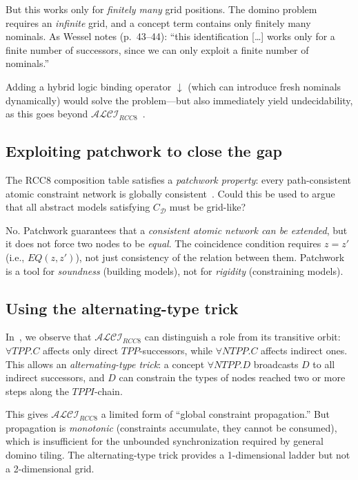\documentclass[11pt]{article}
\newcommand{\ALCIRCC}[1]{\ensuremath{\mathcal{ALCI}_{\mathit{RCC#1}}}}
\begin{document}
But this works only for \emph{finitely many} grid positions.  The domino
problem requires an \emph{infinite} grid, and a concept term contains only
finitely many nominals.  As Wessel notes (p.~43--44): ``this identification
[\ldots] works only for a finite number of successors, since we can only
exploit a finite number of nominals.''

Adding a hybrid logic binding operator $\downarrow$ (which can
introduce fresh nominals dynamically) would solve the problem---but also
immediately yield undecidability, as this goes beyond
$\ALCIRCC{8}$~\cite{Wessel2003}.

\subsection{Exploiting patchwork to close the gap}

The RCC8 composition table satisfies a \emph{patchwork property}: every
path-consistent atomic constraint network is globally
consistent~\cite{RenzNebel1999}.  Could this be used to argue that all
abstract models satisfying $C_\mathcal{D}$ must be grid-like?

No.  Patchwork guarantees that a \emph{consistent atomic network can be
extended}, but it does not force two nodes to be \emph{equal}.  The
coincidence condition requires $z = z'$ (i.e., $EQ(z,z')$), not just
consistency of the relation between them.  Patchwork is a tool for
\emph{soundness} (building models), not for \emph{rigidity} (constraining
models).

\subsection{Using the alternating-type trick}

In~\cite{OurMainPaper}, we observe that $\ALCIRCC{8}$ can distinguish a
role from its transitive orbit: $\forall TPP.C$ affects only direct
$TPP$-successors, while $\forall NTPP.C$ affects indirect ones.  This
allows an \emph{alternating-type trick}: a concept $\forall NTPP.D$ broadcasts
$D$ to all indirect successors, and $D$ can constrain the types of nodes
reached two or more steps along the $TPPI$-chain.

This gives $\ALCIRCC{8}$ a limited form of ``global constraint propagation.''
But propagation is \emph{monotonic} (constraints accumulate, they cannot be
consumed), which is insufficient for the unbounded synchronization required by
general domino tiling.  The alternating-type trick provides a 1-dimensional
ladder but not a 2-dimensional grid.
\end{document}
